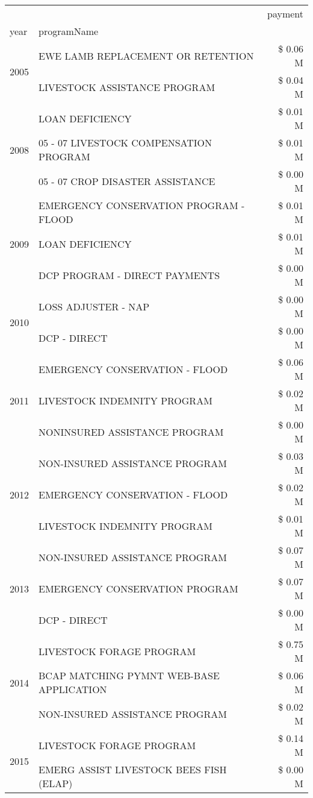 \begin{tabular}{llr}
\toprule
 &  & payment \\
year & programName &  \\
\midrule
\multirow[t]{2}{*}{2005} & EWE LAMB REPLACEMENT OR RETENTION & \$ 0.06 M \\
 & LIVESTOCK ASSISTANCE PROGRAM & \$ 0.04 M \\
\cline{1-3}
\multirow[t]{3}{*}{2008} & LOAN DEFICIENCY & \$ 0.01 M \\
 & 05 - 07 LIVESTOCK COMPENSATION PROGRAM & \$ 0.01 M \\
 & 05 - 07 CROP DISASTER ASSISTANCE & \$ 0.00 M \\
\cline{1-3}
\multirow[t]{3}{*}{2009} & EMERGENCY CONSERVATION PROGRAM - FLOOD & \$ 0.01 M \\
 & LOAN DEFICIENCY & \$ 0.01 M \\
 & DCP PROGRAM - DIRECT PAYMENTS & \$ 0.00 M \\
\cline{1-3}
\multirow[t]{2}{*}{2010} & LOSS ADJUSTER - NAP & \$ 0.00 M \\
 & DCP - DIRECT & \$ 0.00 M \\
\cline{1-3}
\multirow[t]{3}{*}{2011} & EMERGENCY CONSERVATION - FLOOD & \$ 0.06 M \\
 & LIVESTOCK INDEMNITY PROGRAM & \$ 0.02 M \\
 & NONINSURED ASSISTANCE PROGRAM & \$ 0.00 M \\
\cline{1-3}
\multirow[t]{3}{*}{2012} & NON-INSURED ASSISTANCE PROGRAM & \$ 0.03 M \\
 & EMERGENCY CONSERVATION - FLOOD & \$ 0.02 M \\
 & LIVESTOCK INDEMNITY PROGRAM & \$ 0.01 M \\
\cline{1-3}
\multirow[t]{3}{*}{2013} & NON-INSURED ASSISTANCE PROGRAM & \$ 0.07 M \\
 & EMERGENCY CONSERVATION PROGRAM & \$ 0.07 M \\
 & DCP - DIRECT & \$ 0.00 M \\
\cline{1-3}
\multirow[t]{3}{*}{2014} & LIVESTOCK FORAGE PROGRAM & \$ 0.75 M \\
 & BCAP MATCHING PYMNT WEB-BASE APPLICATION & \$ 0.06 M \\
 & NON-INSURED ASSISTANCE PROGRAM & \$ 0.02 M \\
\cline{1-3}
\multirow[t]{2}{*}{2015} & LIVESTOCK FORAGE PROGRAM & \$ 0.14 M \\
 & EMERG ASSIST LIVESTOCK BEES FISH (ELAP) & \$ 0.00 M \\
\cline{1-3}

\end{tabular}
